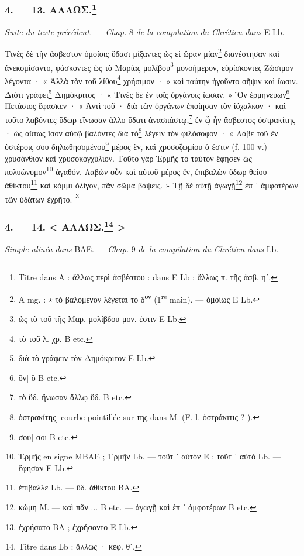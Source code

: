 \documentclass[a4paper, 11pt, oneside, polutonikogreek, french]{article}
\begin{document}
\subsubsection[4. --- 13. ΑΛΛΩΣ.]{4. --- 13. ΑΛΛΩΣ.\footnote{Titre dans A : ἄλλως περὶ ἀσβέστου : dans E Lb : ἄλλως π. τῆς ἀσβ. ηʹ.}}

\emph{Suite du texte précédent.} --- \emph{Chap.} 8 \emph{de la compilation du Chrétien dans} E Lb.

\bigskip

Τινὲς δὲ τὴν ἄσβεστον ὁμοίοις ὕδασι μίξαντες ὡς εἰ ὥραν μίαν\footnote{A mg. : $\star$ τὸ βαλόμενον λέγεται τὸ δ\textsuperscript{ον} (1\textsuperscript{re} main). --- ὁμοίως E Lb.} διανέστησαν καὶ ἀνεκομίσαντο, φάσκοντες ὡς τὸ Μαρίας μολίβου\footnote{ὡς τὸ τοῦ τῆς Μαρ. μολίβδου μον. ἐστιν E Lb.} μονοήμερον, εὑρίσκοντες Ζώσιμον λέγοντα · « Ἀλλὰ τὸν τοῦ λίθου\footnote{τὸ τοῦ λ. χρ. B etc.} χρήσιμον · » καὶ ταύτην ἡγοῦντο σῆψιν καὶ ἴωσιν. Διότι γράφει\footnote{διὰ τὸ γράφειν τὸν Δημόκριτον E Lb.} Δημόκριτος · « Τινὲς δὲ ἐν τοῖς ὀργάνοις ἴωσαν. » Ὃν ἑρμηνεύων\footnote{ὃν] ὃ B etc.} Πετάσιος ἔφασκεν · « Ἀντὶ τοῦ · διὰ τῶν ὀργάνων ἐποίησαν τὸν ἰόχαλκον · καὶ τοῦτο λαβόντες ὕδωρ εἵνωσαν ἄλλο ὕδατι ἀνασπάστῳ,\footnote{τὸ ὕδ. ἥνωσαν ἄλλῳ ὕδ. B etc.} ἐν ᾧ ἦν ἄσβεστος ὀστρακίτης · ὡς αὕτως ἴσον αὐτῷ βαλόντες διὰ τὸ\footnote{ὀστρακίτης] courbe pointillée sur της dans M. (F. l. ὀστράκιτις ? ).} λέγειν τὸν φιλόσοφον · « Λάβε τοῦ ἐν ὑστέροις σου δηλωθησομένου\footnote{σου] σοι B etc.} μέρος ἓν, καὶ χρυσοζωμίου ὃ ἐστιν (f. 100 v.) χρυσάνθιον καὶ χρυσοκογχύλιον. Τοῦτο γὰρ Ἑρμῆς τὸ ταὐτὸν ἔφησεν ὡς πολυώνυμον\footnote{Ἑρμῆς en signe MBAE ; Ἑρμῆν Lb. --- τοῦτ ᾽ αὐτὸν E ; τοῦτ ᾽ αὐτὸ Lb. --- ἔφησαν E Lb.} ἀγαθόν. Λαβὼν οὖν καὶ αὐτοῦ μέρος ἓν, ἐπιβαλὼν ὕδωρ θείου ἀθίκτου\footnote{ἐπίβαλλε Lb. --- ὕδ. ἀθίκτου BA.} καὶ κόμμι ὀλίγον, πᾶν σῶμα βάψεις. » Τῇ δὲ αὐτῇ ἀγωγῇ\footnote{κώμη M. --- καὶ πᾶν ... B etc. --- ἀγωγῇ καὶ ἐπ ᾽ ἀμφοτέρων B etc.} ἐπ ᾽ ἀμφοτέρων τῶν ὑδάτων ἐχρῆτο.\footnote{ἐχρήσατο BA ; ἐχρήσαντο E Lb.}

\bigskip
\centerline{\EightStarTaper}
\centerline{\EightStarTaper\EightStarTaper}
\bigskip

\subsubsection[4. --- 14. < ΑΛΛΩΣ. >]{4. --- 14. < ΑΛΛΩΣ.\footnote{Titre dans Lb : ἄλλως · κεφ. θʹ.} >}

\emph{Simple alinéa dans} BAE. --- \emph{Chap.} 9 \emph{de la compilation du Chrétien dans} Lb.
\end{document}
